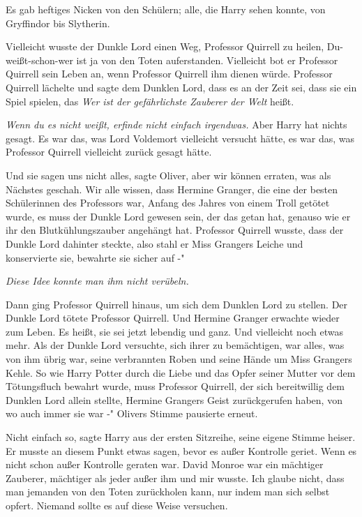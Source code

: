 Es gab heftiges Nicken von den Schülern; alle, die Harry sehen konnte, von
Gryffindor bis Slytherin.

\glqq Vielleicht wusste der Dunkle Lord einen Weg, Professor Quirrell zu heilen,
Du-weißt-schon-wer ist ja von den Toten auferstanden. Vielleicht bot er
Professor Quirrell sein Leben an, wenn Professor Quirrell ihm dienen würde.
Professor Quirrell lächelte und sagte dem Dunklen Lord, dass es an der Zeit sei,
dass sie ein Spiel spielen, das \emph{\glqq Wer ist der gefährlichste Zauberer
der Welt\grqq{} } heißt.\emph{\glqq}

\emph{Wenn du es nicht weißt, erfinde nicht einfach irgendwas.}
Aber Harry hat nichts gesagt. Es war das, was Lord Voldemort vielleicht versucht
hätte, es war das, was Professor Quirrell vielleicht zurück gesagt hätte.

\glqq Und sie sagen uns nicht alles\grqq{}, sagte Oliver, \glqq aber wir können
erraten, was als Nächstes geschah. Wir alle wissen, dass Hermine Granger, die
eine der besten Schülerinnen des Professors war, Anfang des Jahres von einem
Troll getötet wurde, es muss der Dunkle Lord gewesen sein, der das getan hat,
genauso wie er ihr den Blutkühlungszauber angehängt hat. Professor Quirrell
wusste, dass der Dunkle Lord dahinter steckte, also stahl er Miss Grangers
Leiche und konservierte sie, bewahrte sie sicher auf -"

\emph{Diese Idee konnte man ihm nicht verübeln.}

\glqq Dann ging Professor Quirrell hinaus, um sich dem Dunklen Lord zu stellen.
Der Dunkle Lord tötete Professor Quirrell. Und Hermine Granger erwachte wieder
zum Leben. Es heißt, sie sei jetzt lebendig und ganz. Und vielleicht noch etwas
mehr. Als der Dunkle Lord versuchte, sich ihrer zu bemächtigen, war alles, was
von ihm übrig war, seine verbrannten Roben und seine Hände um Miss Grangers
Kehle. So wie Harry Potter durch die Liebe und das Opfer seiner Mutter vor dem
Tötungsfluch bewahrt wurde, muss Professor Quirrell, der sich bereitwillig dem
Dunklen Lord allein stellte, Hermine Grangers Geist zurückgerufen haben, von wo
auch immer sie war -" Olivers Stimme pausierte erneut.

\glqq Nicht einfach so\grqq{}, sagte Harry aus der ersten Sitzreihe, seine
eigene Stimme heiser. Er musste an diesem Punkt etwas sagen, bevor es außer
Kontrolle geriet. Wenn es nicht schon außer Kontrolle geraten war. \glqq David
Monroe war ein mächtiger Zauberer, mächtiger als jeder außer ihm und mir wusste.
Ich glaube nicht, dass man jemanden von den Toten zurückholen kann, nur indem
man sich selbst opfert. Niemand sollte es auf diese Weise versuchen.\grqq{}

